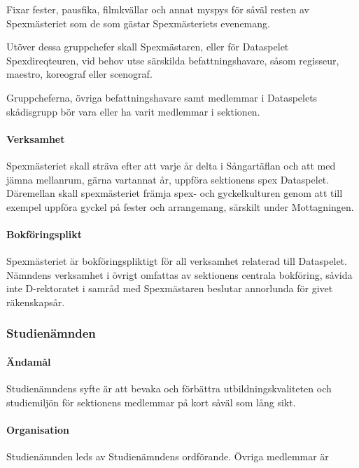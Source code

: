 \documentclass[a4paper,12pt]{article}
\begin{document}
Fixar fester, pausfika, filmkvällar och annat myspys för såväl resten av Spexmästeriet som de som gästar Spexmästeriets evenemang.

Utöver dessa gruppchefer skall Spexmästaren, eller för Dataspelet Spexdireqteuren, vid behov utse särskilda befattningshavare, såsom regisseur, maestro, koreograf eller scenograf.

Gruppcheferna, övriga befattningshavare samt medlemmar i Dataspelets skådisgrupp bör vara eller ha varit medlemmar i sektionen.

\paragraph{Verksamhet}

Spexmästeriet skall sträva efter att varje år delta i Sångartäflan och att med jämna mellanrum, gärna vartannat år, uppföra sektionens spex Dataspelet. Däremellan skall spexmästeriet främja spex- och gyckelkulturen genom att till exempel uppföra gyckel på fester och arrangemang, särskilt under Mottagningen.

\paragraph{Bokföringsplikt}

Spexmästeriet är bokföringspliktigt för all verksamhet relaterad till Dataspelet. Nämndens verksamhet i övrigt omfattas av sektionens centrala bokföring, såvida inte D-rektoratet i samråd med Spexmästaren beslutar annorlunda för givet räkenskapsår.

\subsubsection{Studienämnden}

\paragraph{Ändamål}

Studienämndens syfte är att bevaka och förbättra utbildningskvaliteten och studiemiljön för sektionens medlemmar på kort såväl som lång sikt.

\paragraph{Organisation}

Studienämnden leds av Studienämndens ordförande. Övriga medlemmar är
\end{document}
